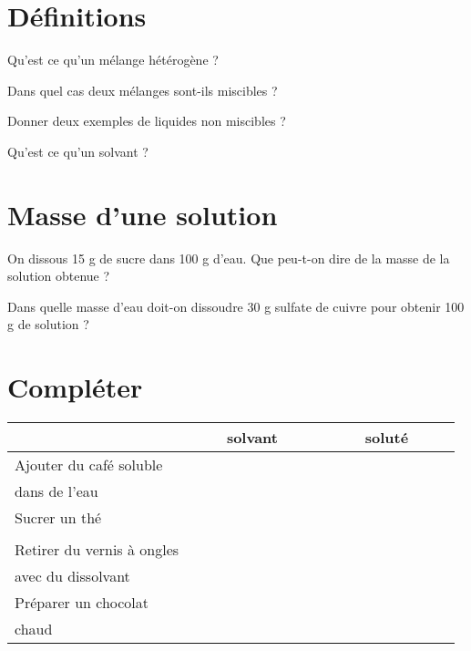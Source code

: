 \section{Définitions}

\begin{questions}
	\question Qu'est ce qu'un mélange hétérogène ?
	\fillwithdottedlines{2cm}
	
	\question Dans quel cas deux mélanges sont-ils miscibles ?
	\fillwithdottedlines{2cm}
	
	
	\question Donner deux exemples de liquides non miscibles ?
	\fillwithdottedlines{3cm}
	
	\question Qu'est ce qu'un solvant ?
	\fillwithdottedlines{2cm}
\end{questions}

\section{Masse d'une solution}

\begin{questions}
	\question On dissous 15 g de sucre dans 100 g d'eau. Que peu-t-on dire de la masse de la solution obtenue ?
	\fillwithdottedlines{2cm}
	
	\question Dans quelle masse d'eau doit-on dissoudre 30 g sulfate de cuivre pour obtenir 100 g de solution ?
	\fillwithdottedlines{2cm}
	
\end{questions}

\section{Compléter}
\begin{center}
		
	\begin{tabular}{|@{\ }l@{\ }|c|c|}
		\hline
		& \ \ \ \ solvant \ \ \ \ & \ \ \ \  soluté \ \ \ \  \\ \hline
		Ajouter du café soluble    &        &         \\ %
		dans de l'eau              &        &         \\ \hline
		Sucrer un thé              &        &         \\ %
		&        &         \\ \hline
		Retirer du vernis à ongles &        &         \\ %
		avec du dissolvant         &        &         \\ \hline
		Préparer un chocolat       &        &         \\ %
		chaud                      &        &         \\ \hline
	\end{tabular}
\end{center}